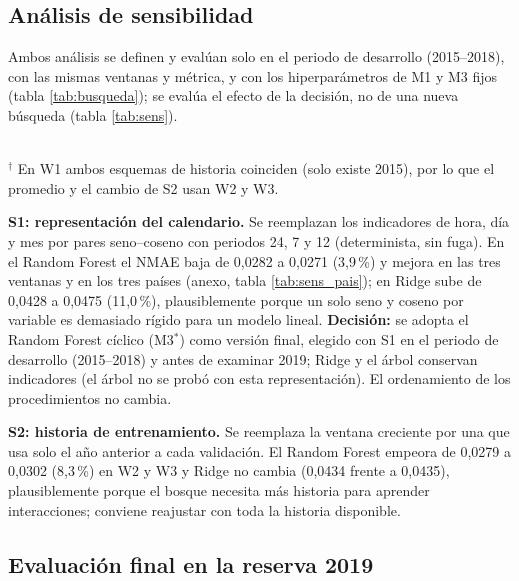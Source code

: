 \subsection{Análisis de sensibilidad} \label{sec:sens}

Ambos análisis se definen y evalúan solo en el periodo de desarrollo (2015--2018), con las mismas ventanas y métrica, y con los hiperparámetros de M1 y M3 fijos (tabla \ref{tab:busqueda}); se evalúa el efecto de la decisión, no de una nueva búsqueda (tabla \ref{tab:sens}).

\begin{table}[!htbp]
    \centering
        \caption{NMAE macro por ventana en los análisis de sensibilidad (Ridge y Random Forest) y cambio relativo del promedio frente al escenario base.\label{tab:sens}}
        \small
        
    \\ $^\dagger$ En W1 ambos esquemas de historia coinciden (solo existe 2015), por lo que el promedio y el cambio de S2 usan W2 y W3.
\end{table}

\textbf{S1: representación del calendario.} Se reemplazan los indicadores de hora, día y mes por pares seno--coseno con periodos 24, 7 y 12 (determinista, sin fuga). En el Random Forest el NMAE baja de 0,0282 a 0,0271 (3,9\,\%) y mejora en las tres ventanas y en los tres países (anexo, tabla \ref{tab:sens_pais}); en Ridge sube de 0,0428 a 0,0475 (11,0\,\%), plausiblemente porque un solo seno y coseno por variable es demasiado rígido para un modelo lineal. \textbf{Decisión:} se adopta el Random Forest cíclico (M3$^\ast$) como versión final, elegido con S1 en el periodo de desarrollo (2015--2018) y antes de examinar 2019; Ridge y el árbol conservan indicadores (el árbol no se probó con esta representación). El ordenamiento de los procedimientos no cambia.

\textbf{S2: historia de entrenamiento.} Se reemplaza la ventana creciente por una que usa solo el año anterior a cada validación. El Random Forest empeora de 0,0279 a 0,0302 (8,3\,\%) en W2 y W3 y Ridge no cambia (0,0434 frente a 0,0435), plausiblemente porque el bosque necesita más historia para aprender interacciones; conviene reajustar con toda la historia disponible.

\subsection{Evaluación final en la reserva 2019} \label{sec:final}

